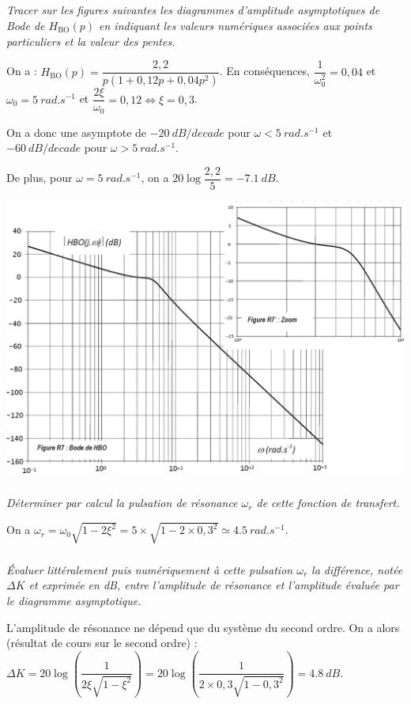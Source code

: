 \documentclass[10pt,fleqn]{article} %
\begin{document}
\begin{multicols}{2}
\subparagraph{}\textit{Tracer sur les figures suivantes les diagrammes d’amplitude asymptotiques de
Bode de $H_{\text{BO}}(p)$ en indiquant les valeurs numériques associées aux
points particuliers et la valeur des pentes.}
\ifprof
\begin{corrige}
On a : $H_{\text{BO}}(p)=\dfrac{2,2}{p\left(1+0,12p + 0,04 p ^2  \right)}$. En conséquences, $\dfrac{1}{\omega_0^2}={0,04}$ et $\omega_0 = \SI{5}{rad.s^{-1}}$ et $\dfrac{2\xi}{\omega_0}=0,12 \Leftrightarrow \xi=0,3$.


On a donc une asymptote de $-\SI{20}{dB/decade}$ pour $\omega<\SI{5}{rad.s^{-1}}$ et $-\SI{60}{dB/decade}$ pour $\omega>\SI{5}{rad.s^{-1}}$.

De plus, pour $\omega=\SI{5}{rad.s^{-1}}$, on a $20\log\dfrac{2,2}{5}=\SI{-7,1}{dB}$. 

\end{corrige}
\else
\fi

\ifprof
\else
\begin{center}
\includegraphics[width=\linewidth]{images/fig_07}
\end{center}
\fi
\subparagraph{}\textit{Déterminer par calcul la pulsation de résonance $\omega_r$ de cette fonction
de transfert.}
\ifprof
\begin{corrige}
On a $\omega_r = \omega_0\sqrt{1-2\xi^2}=5\times \sqrt{1-2\times 0,3^2}\simeq \SI{4,5}{rad.s^{-1}}$.
\end{corrige}
\else
\fi


\subparagraph{}\textit{Évaluer littéralement puis numériquement à cette pulsation
$\omega_r$ la différence, notée $\Delta K$ et exprimée en dB, entre l’amplitude
de résonance et l’amplitude évaluée par le diagramme asymptotique.}
\ifprof
\begin{corrige}
L'amplitude de résonance ne dépend que du système du second ordre. On a alors (résultat de cours sur le second ordre) : 
$\Delta K = 20\log \left( \dfrac{1}{2\xi \sqrt{1-\xi^2}}\right)=20\log \left( \dfrac{1}{2\times 0,3 \sqrt{1-0,3^2}}\right)=\SI{4,8}{dB}$. 
\end{corrige}
\else
\fi


\end{multicols}
\end{document}
